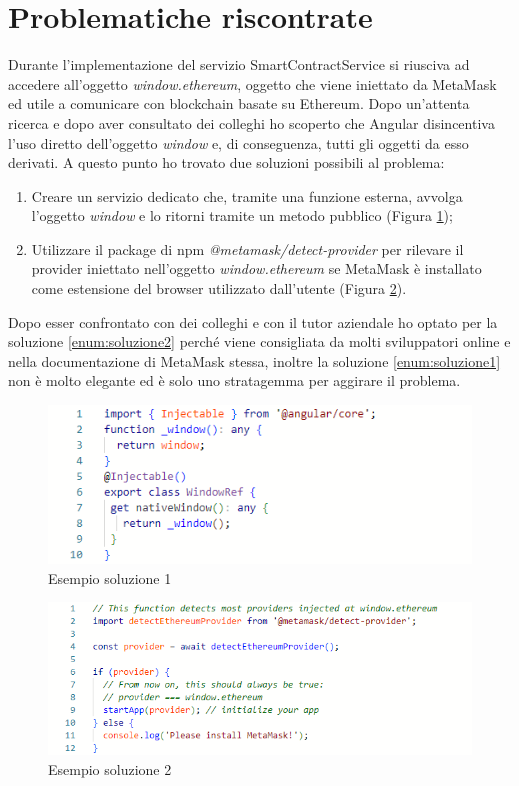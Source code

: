 \section{Problematiche riscontrate}
Durante l'implementazione del servizio SmartContractService si riusciva ad accedere all'oggetto \textit{window.ethereum}, oggetto che viene iniettato da MetaMask ed utile a comunicare con blockchain basate su Ethereum. Dopo un'attenta ricerca e dopo aver consultato dei colleghi ho scoperto che Angular disincentiva l'uso diretto dell'oggetto \textit{window} e, di conseguenza, tutti gli oggetti da esso derivati. A questo punto ho trovato due soluzioni possibili al problema:
\begin{enumerate}
    \item \label{enum:soluzione1} Creare un servizio dedicato che, tramite una funzione esterna, avvolga l'oggetto \textit{window} e lo ritorni tramite un metodo pubblico (Figura \ref{fig:soluzione1});
    \item \label{enum:soluzione2} Utilizzare il package di npm \textit{@metamask/detect-provider} per rilevare il provider iniettato nell'oggetto \textit{window.ethereum} se MetaMask è installato come estensione del browser utilizzato dall'utente (Figura \ref{fig:soluzione2}).
\end{enumerate}
Dopo esser confrontato con dei colleghi e con il tutor aziendale ho optato per la soluzione \ref{enum:soluzione2} perché viene consigliata da molti sviluppatori online e nella documentazione di MetaMask stessa, inoltre la soluzione \ref{enum:soluzione1} non è molto elegante ed è solo uno stratagemma per aggirare il problema.\cite{site:ethereum-provider}

\begin{figure}[!h] 
    \centering 
    \includegraphics[width=0.9\columnwidth]{immagini/soluzione1.png} 
    \caption{Esempio soluzione 1}
    \label{fig:soluzione1}
\end{figure}

\begin{figure}[!h] 
    \centering 
    \includegraphics[width=0.9\columnwidth]{immagini/soluzione2.png} 
    \caption{Esempio soluzione 2}
    \label{fig:soluzione2}
\end{figure}